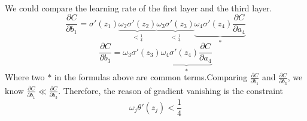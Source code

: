 \documentclass[12pt]{article}
\begin{document}
	\\
	We could compare the learning rate of the first layer and the third layer.\\
	$$\frac{\partial C}{\partial b_1} = \sigma'(z_1)\underbrace{\omega_2\sigma'(z_2)}_{<\frac{1}{4}}\underbrace{\omega_3\sigma'(z_3)}_{<\frac{1}{4}}\underbrace{\omega_4\sigma'(z_4)\frac{\partial C}{\partial a_4}}_{*}$$
	$$\frac{\partial C}{\partial b_3} = \omega_3\sigma'(z_3)\underbrace{\omega_4\sigma'(z_4)\frac{\partial C}{\partial a_4}}_{*}$$
	Where two $*$ in the formulas above are common terms.Comparing $\frac{\partial C}{\partial b_1}$ and $\frac{\partial C}{\partial b_3}$, we know $\frac{\partial C}{\partial b_1} \ll \frac{\partial C}{\partial b_3}$. Therefore, the reason of gradient vanishing is the constraint
	$$\omega_j\theta'(z_j)<\frac{1}{4}$$
	
	
\end{document}
